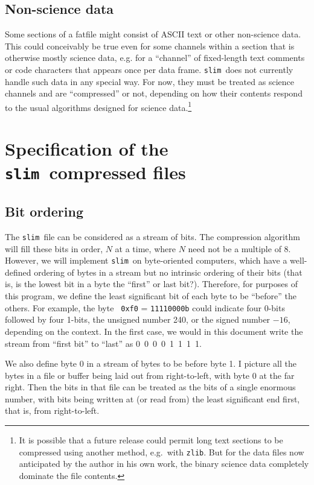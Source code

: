 \documentclass[11pt]{article}
\newcommand{\slim}{{\tt slim}}
\begin{document}
\subsection{Non-science data}

Some sections of a fatfile might consist of ASCII text or other
non-science data.  This could conceivably be true even for some
channels within a section that is otherwise mostly science data,
e.g. for a ``channel'' of fixed-length text comments or code
characters that appears once per data frame.  \slim\ does not
currently handle such data in any special way.  For now, they must be
treated as science channels and are ``compressed'' or not, depending
on how their contents respond to the usual algorithms designed for
science data.\footnote{It is possible that a future release could
permit long text sections to be compressed using another method, e.g.\
with {\tt zlib}.  But for the data files now anticipated by the author
in his own work, the binary science data completely dominate the file
contents.}



\section{Specification of the \slim\ compressed files}
\label{sec:fileformat}

\subsection{Bit ordering}

The \slim\ file can be considered as a stream of bits.  The
compression algorithm will fill these bits in order, $N$ at a time,
where $N$ need not be a multiple of 8.  However, we will implement
\slim\ on byte-oriented computers, which have a well-defined ordering
of bytes in a stream but no intrinsic ordering of their bits (that is,
is the lowest bit in a byte the ``first'' or last bit?).  Therefore,
for purposes of this program, we define the least significant bit of
each byte to be ``before'' the others.  For example, the byte {\tt
0xf0} = {\tt 11110000b} could indicate four 0-bits followed by four
1-bits, the unsigned number 240, or the signed number $-16$,
depending on the context.  In the first case, we would in this
document write the stream from ``first bit'' to ``last'' as 0~0~0~0~1~1~1~1.

We also define byte 0 in a stream of bytes to be before byte 1.
I picture all the bytes in a file or buffer being laid out from
right-to-left, with byte 0 at the far right.  Then the bits in that
file can be treated as the bits of a single enormous number, with bits
being written at (or read from) the least significant end first, that
is, from right-to-left.
\end{document}
